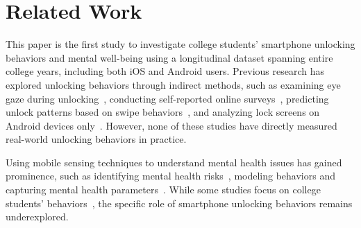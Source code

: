 \section{Related Work}
\label{literature}
\vspace{-2pt}
This paper is the first study to investigate college students' smartphone unlocking behaviors and mental well-being using a longitudinal dataset spanning entire college years, including both iOS and Android users.
Previous research has explored unlocking behaviors through indirect methods, such as examining eye gaze during unlocking~\cite{abdrabou2024eyegaze}, conducting self-reported online surveys~\cite{harbach2014survey}, predicting unlock patterns based on swipe behaviors~\cite{li2019swipevlock}, and analyzing lock screens on Android devices only~\cite{harbach2016anatomy}. However, none of these studies have directly measured real-world unlocking behaviors in practice.

Using mobile sensing techniques to understand mental health issues has gained prominence, such as identifying mental health risks~\cite{adler2022machine, faurholt2019objective, wang2022first}, modeling behaviors and capturing mental health parameters~\cite{likamwa2013moodscope, macleod2021mobile, mehrotra2017mytraces, tag2022emotion}. While some studies focus on college students' behaviors~\cite{macleod2021mobile, meegahapola2020smartphone, meegahapola2023generalization, wang2021transition}, the specific role of smartphone unlocking behaviors remains underexplored.



